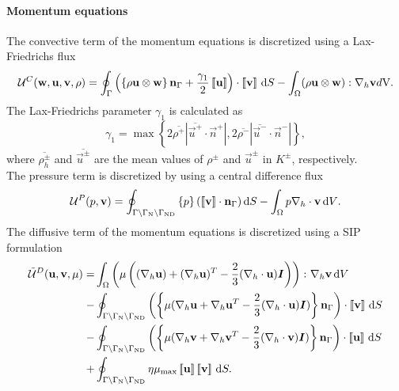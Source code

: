 \paragraph{Momentum equations}
The convective term of the momentum equations is discretized using a Lax-Friedrichs flux
\begin{equation}
	\mathcal{U}^C(\textbf{w},\textbf{u},\textbf{v}, \rho)=  \oint_{\Gamma}{\left( \left\{{\rho\textbf{u}\otimes\textbf{w} }\right\}\textbf{n}_\Gamma + \frac{\gamma_1}{2}\left[\!\left[{{\textbf{u}}}\right]\!\right]\right)\cdot\left[\!\left[{{\textbf{v}}}\right]\!\right] \,\mathrm{d} S}
	-\int_{\Omega}({\rho\textbf{u}\otimes\textbf{w}}):\nabla_h\textbf{v} d\text{V}.
	\label{eq:Mom_convective}\\
\end{equation}
The Lax-Friedrichs parameter $\gamma_1$ is calculated as \textcite{kleinHighorderDiscontinuousGalerkin2016}
\begin{equation}
	\gamma_1  = \max \left\{2 \overline{\rho^+} |\overline{\vec{u}^+} \cdot \vec{n}^+|,2 \overline{\rho^-} |\overline{\vec{u}^-} \cdot \vec{n}^-|\right\},
	\label{eq:vardens_lambda}
\end{equation}
where $\overline{\rho_{h}^\pm}$ and $\overline{\vec{u}^\pm}$ are the mean values of $\rho^\pm$ and $\vec{u}^\pm$ in $K^\pm$, respectively.\\
The pressure term is discretized by using a central difference flux
\begin{equation}
	\mathcal{U}^P(p,\textbf{v})=  \oint_{\Gamma \setminus \Gamma_{\text{N}}\setminus \Gamma_{\text{ND}}}{ \left\{{p}\right\}(\left[\!\left[{{\textbf{v}}}\right]\!\right]\cdot \textbf{n}_\Gamma  )\,\mathrm{d} S}
	- \int_{\Omega}{p \nabla_h \cdot \textbf{v} \,\mathrm{d} V}. \label{eq:Mom_pressure}
\end{equation}
The diffusive term of the momentum equations is discretized using a \gls{SIP} formulation \parencite{shahbaziExplicitExpressionPenalty2005}
\begin{equation}
	\begin{aligned}
		\tilde{\mathcal{U}}^D(\vec{u},\vec{v},\mu) =
		  & \int_{\Omega}{\left(\mu\left((\nabla_h \vec{u}) + (\nabla_h \vec{u})^T - \frac{2}{3}(\nabla_h\cdot \vec{u})\mytensor{I} \right)\right)\colon \nabla_h\vec{v}} \dV \\
		- & \oint_{\Gamma \setminus \Gamma_{\text{N}}\setminus \Gamma_{\text{ND}}}
		\left(\mean{\mu(\nabla_h\vec{u} + \nabla_h\vec{u}^T - \frac{2}{3}(\nabla_h\cdot \vec{u})\mytensor{I})}\normalBoundary\right)\cdot\jump{\vec{v}}\dS                    \\
		- & \oint_{\Gamma \setminus \Gamma_{\text{N}}\setminus \Gamma_{\text{ND}}}
		\left(\mean{\mu(\nabla_h\vec{v} + \nabla_h\vec{v}^T - \frac{2}{3}(\nabla_h\cdot \vec{v})\mytensor{I})}\normalBoundary\right)\cdot\jump{\vec{u}} \dS                   \\
		+ & \oint_{\Gamma \setminus \Gamma_{\text{N}}\setminus \Gamma_{\text{ND}}} \eta \mu_{\text{max}} \jump{\vec{u}} \jump{\vec{v}}\dS.
		\label{eq:Mom_diffusive}
	\end{aligned}
\end{equation}
